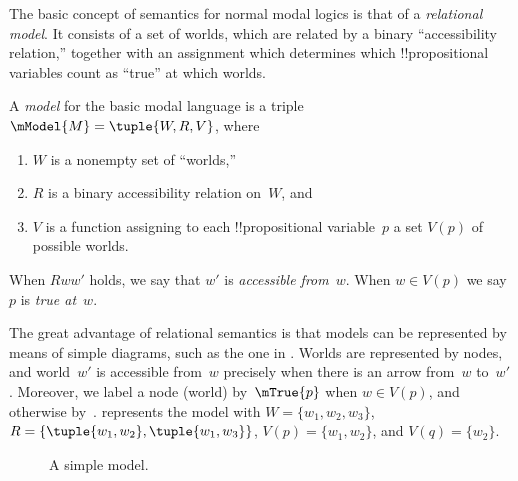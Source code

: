 \documentclass[../../../include/open-logic-section]{subfiles}
\begin{document}


The basic concept of semantics for normal modal logics is that of a
\emph{relational model}. It consists of a set of worlds, which are
related by a binary ``accessibility relation,'' together with an
assignment which determines which !!{propositional variable}s count as
``true'' at which worlds.

\begin{defn}
  A \emph{model} for the basic modal language is a triple $\mModel{M}
  = \tuple{W, R, V}$, where
  \begin{enumerate}
  \item $W$ is a nonempty set of ``worlds,''
  \item $R$ is a binary accessibility relation on~$W$, and
  \item $V$ is a function assigning to each !!{propositional
    variable}~$p$ a set $V(p)$ of possible worlds.
  \end{enumerate}
  When $Rww'$ holds, we say that $w'$ is \emph{accessible
    from}~$w$. When $w \in V(p)$ we say $p$ is \emph{true at}~$w$.
\end{defn}

The great advantage of relational semantics is that models can be
represented by means of simple diagrams, such as the one in
. Worlds are represented by nodes, and world~$w'$ is
accessible from~$w$ precisely when there is an arrow from~$w$
to~$w'$. Moreover, we label a node (world) by~$\mTrue{p}$ when $w \in V(p)$,
and otherwise by~.  represents the model
with $W = \{w_1, w_2, w_3\}$, $R = \{\tuple{w_1, w_2},\tuple{w_1,
  w_3}\}$, $V(p) = \{w_1, w_2\}$, and $V(q) = \{w_2\}$.

\begin{figure}
  \begin{center}
  \end{center}
  \caption{A simple model.}
\end{figure}
\end{document}
